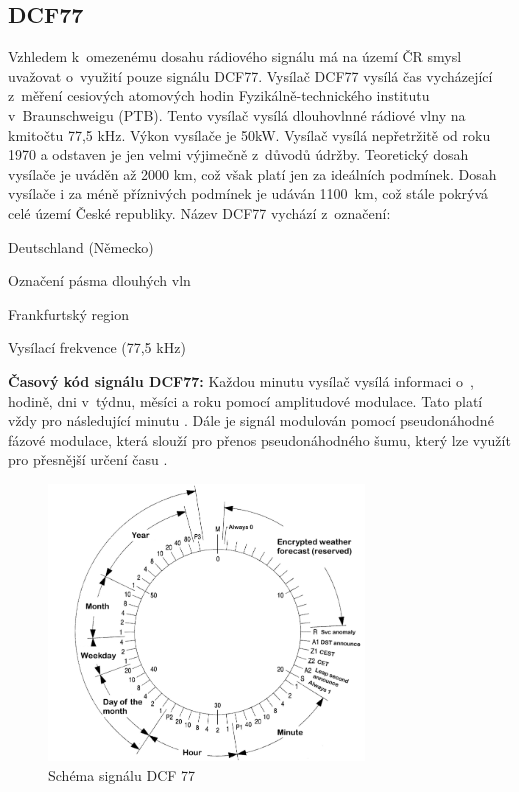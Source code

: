 \subsection{DCF77}
Vzhledem k~omezenému dosahu rádiového signálu má na území ČR smysl uvažovat o~využití pouze signálu DCF77. Vysílač DCF77 vysílá čas vycházející z~měření cesiových atomových hodin Fyzikálně-technického institutu v~Braunschweigu (PTB). Tento vysílač vysílá dlouhovlnné rádiové vlny na kmitočtu 77,5 kHz. Výkon vysílače je 50kW. Vysílač vysílá nepřetržitě od roku 1970 a odstaven je jen velmi výjimečně z~důvodů údržby. Teoretický dosah vysílače je uváděn až 2000 km, což však platí jen za ideálních podmínek. Dosah vysílače i za méně příznivých podmínek je udáván 1100~km, což stále pokrývá celé území České republiky.\cite{ptb_dcf77} Název DCF77 vychází z~označení:
\begin{description}[leftmargin=!,labelwidth=\widthof{\bfseries D --}]
    \item[\textbf{D} --] Deutschland (Německo)
    \item[\textbf{C} --] Označení pásma dlouhých vln
    \item[\textbf{F} --] Frankfurtský region
    \item[\textbf{77} --] Vysílací frekvence (77,5 kHz)
\end{description}

\textbf{Časový kód signálu DCF77:}
Každou minutu vysílač vysílá informaci o~, hodině, dni v~týdnu, měsíci a roku pomocí amplitudové modulace. Tato  platí vždy pro následující minutu \cite{fel_dcf77}. Dále je signál modulován pomocí pseudo\-náhodné fázové modulace, která slouží pro přenos pseudonáhodného šumu, který lze využít pro přesnější určení času \cite{vyvoj_hw_poupa} \cite{ptb_2012}.

\begin{figure}[H]
	\centering
	\includegraphics[width=8.4cm]{images/komponenty/schema_DCF77_signalu_lepsi.png}
	\caption{Schéma signálu DCF 77 \cite{fel_dcf77}}
\end{figure}

